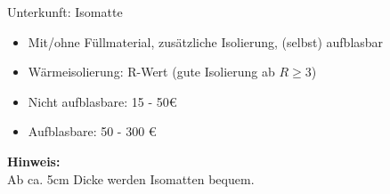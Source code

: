 \documentclass[aspectratio=169]{beamer}
\newcommand{\tipp}[2][Tipp]{\vspace{0.2cm}\textbf{#1:}\\#2}
\begin{document}
			
			\begin{frame}{Unterkunft: Isomatte}
				\begin{itemize}
					\item Mit/ohne Füllmaterial, zusätzliche Isolierung, (selbst) aufblasbar
					\item Wärmeisolierung: R-Wert (gute Isolierung ab $R \geq 3$)
					\item Nicht aufblasbare: 15 - 50€
					\item Aufblasbare: 50 - 300 €
				\end{itemize}\pause
				\tipp[Hinweis]{Ab ca. 5cm Dicke werden Isomatten bequem.}
			\end{frame}
			
			
\end{document}
